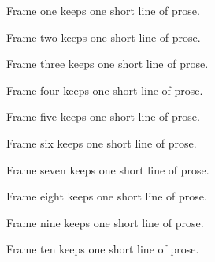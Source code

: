 \documentclass{article}
\begin{document}
Frame one keeps one short line of prose.
\newpage

Frame two keeps one short line of prose.
\newpage

Frame three keeps one short line of prose.
\newpage

Frame four keeps one short line of prose.
\newpage

Frame five keeps one short line of prose.
\newpage

Frame six keeps one short line of prose.
\newpage

Frame seven keeps one short line of prose.
\newpage

Frame eight keeps one short line of prose.
\newpage

Frame nine keeps one short line of prose.
\newpage

Frame ten keeps one short line of prose.
\end{document}
